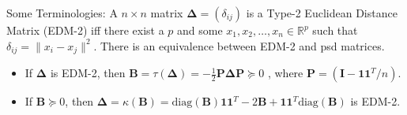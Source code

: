 \documentclass[professionalfonts,hyperref={pdfpagelabels=false,colorlinks=true,linkcolor=red}]{beamer}
\begin{document}
\begin{frame}{Some Terminologies:}
  \vskip5pt A $n \times n$ matrix $\bm{\Delta} =
    (\delta_{ij})$ is a \alert{Type-2 Euclidean Distance Matrix} (EDM-2) iff there exist a $p$ and some $x_1, x_2, \dots, x_n \in
    \mathbb{R}^{p}$ such that $\delta_{ij} = \|x_i - x_j\|^{2}$.  
 \vskip10pt There is an equivalence between EDM-2 and psd matrices.
    \begin{itemize}
    \item If $\bm{\Delta}$ is EDM-2, then 
        $\mathbf{B} =
        \tau(\bm{\Delta}) = - \frac{1}{2} \mathbf{P} \bm{\Delta}
        \mathbf{P} \succeq 0$ , where $\mathbf{P} =
      (\mathbf{I} - \bm{1}\bm{1}^{T}/n)$.
    \item If $\bm{B} \succeq 0$, then 
        $\bm{\Delta} =
        \kappa(\mathbf{B}) = \mathrm{diag}(\mathbf{B})\bm{1}\bm{1}^{T} -
        2\mathbf{B} + \bm{1}\bm{1}^{T}\mathrm{diag}(\mathbf{B})$       
      is EDM-2.
    \end{itemize}
\end{frame}
\end{document}
